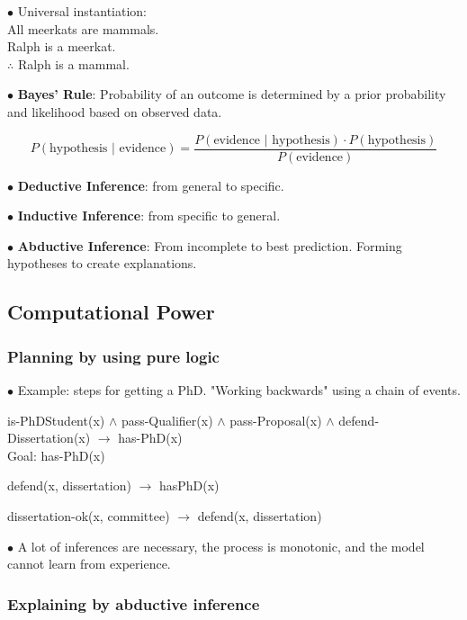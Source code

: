 \documentclass[english,openany]{book}
\begin{document}
$\bullet$ Universal instantiation:\\ All meerkats are mammals.\\ Ralph is a meerkat.\\ $\therefore$ Ralph is a mammal.

$\bullet$ \textbf{Bayes' Rule}: Probability of an outcome is determined by a prior probability and likelihood based on observed data.

$$P (\textrm{hypothesis } | \textrm{ evidence}) = \frac{P(\textrm{evidence } | \textrm{ hypothesis}) \cdot P(\textrm{hypothesis})}{P(\textrm{evidence})}$$


$\bullet$ \textbf{Deductive Inference}: from general to specific.

$\bullet$ \textbf{Inductive Inference}: from specific to general.


$\bullet$ \textbf{Abductive Inference}: From incomplete to best prediction. Forming hypotheses to create explanations.

\subsection{Computational Power}

\subsubsection{Planning by using pure logic}

$\bullet$ Example: steps for getting a PhD. "Working backwards" using a chain of events.

is-PhDStudent(x) $\wedge$ pass-Qualifier(x) $\wedge$ pass-Proposal(x) $\wedge$ defend-Dissertation(x) $\rightarrow$ has-PhD(x)\\

Goal: has-PhD(x)

defend(x, dissertation) $\rightarrow$ hasPhD(x)

dissertation-ok(x, committee) $\rightarrow$ defend(x, dissertation)

$\bullet$ A lot of inferences are necessary, the process is monotonic, and the model cannot learn from experience.

\subsubsection{Explaining by abductive inference}
\end{document}
